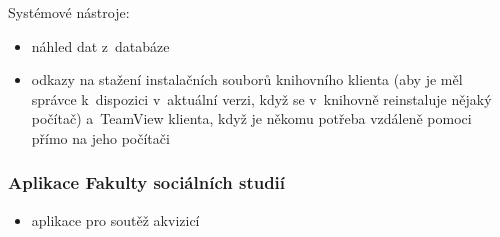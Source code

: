 \documentclass[
	11pt, oneside, printed, final, palatino
	microtype,
	table,   %
	lof,     %
	lot     %
]{fithesis3}
\begin{document}
{\noindent Systémové nástroje:

\begin{itemize}
\item náhled dat z~databáze
\item odkazy na stažení instalačních souborů knihovního klienta (aby je měl správce k~dispozici v~aktuální verzi, když se v~knihovně reinstaluje nějaký počítač) a~TeamView klienta, když je někomu potřeba vzdáleně pomoci přímo na jeho počítači
\end{itemize}

\subsubsection{{\large Aplikace Fakulty sociálních studií}}

\begin{itemize}
\item aplikace pro soutěž akvizicí
\end{itemize}

}
\end{document}
